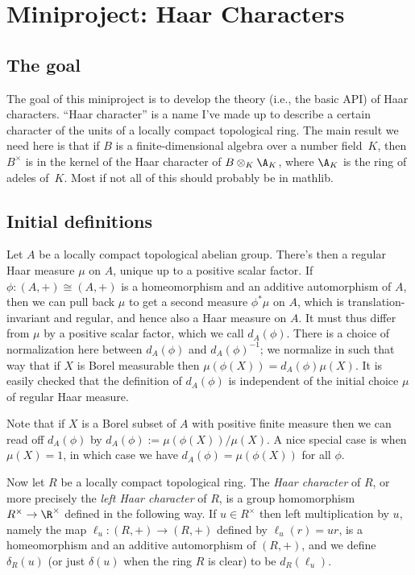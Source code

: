 \chapter{Miniproject: Haar Characters}\label{Haar_char_project}

\section{The goal}

The goal of this miniproject is to develop the theory (i.e., the basic API) of Haar characters.
``Haar character'' is a name I've made up to describe a certain character of the units of a locally
compact topological ring. The main result we need here is that if $B$ is a finite-dimensional
algebra over a number field~$K$, then $B^\times$ is in the kernel of the Haar character
of $B\otimes_K\A_K$, where $\A_K$ is the ring of adeles of~$K$. Most if not all of this
should probably be in mathlib.

\section{Initial definitions}

Let $A$ be a locally compact topological abelian group. There's then a regular Haar measure $\mu$
on $A$, unique up to a positive scalar factor. If $\phi:(A,+)\cong(A,+)$ is a homeomorphism
and an additive automorphism of $A$, then we can pull back $\mu$
to get a second measure $\phi^*\mu$ on $A$, which is translation-invariant and regular,
and hence also a Haar measure on $A$. It must thus differ from $\mu$ by a positive scalar
factor, which we call $d_A(\phi)$. There is a choice of normalization here between $d_A(\phi)$
and $d_A(\phi)^{-1}$; we normalize in such that way that
if $X$ is Borel measurable then $\mu(\phi(X))=d_A(\phi)\mu(X)$.
It is easily checked that the definition of $d_A(\phi)$ is independent of the initial choice
$\mu$ of regular Haar measure.

Note that if $X$ is a Borel subset of $A$ with positive finite measure then we can read
off $d_A(\phi)$ by $d_A(\phi):=\mu(\phi(X))/\mu(X)$. A nice special case is when
$\mu(X)=1$, in which case we have $d_A(\phi)=\mu(\phi(X))$ for all $\phi$.

Now let $R$ be a locally compact topological ring. The \emph{Haar character} of $R$,
or more precisely the \emph{left Haar character} of $R$, is a group homomorphism
$R^\times\to\R^\times$ defined in the following way. If $u\in R^\times$ then left multiplication
by $u$, namely the map $\ell_u:(R,+)\to(R,+)$ defined by $\ell_u(r)=ur$, is a homeomorphism and
an additive automorphism of $(R,+)$, and we define $\delta_R(u)$ (or just $\delta(u)$ when
the ring $R$ is clear) to be $d_R(\ell_u)$.

